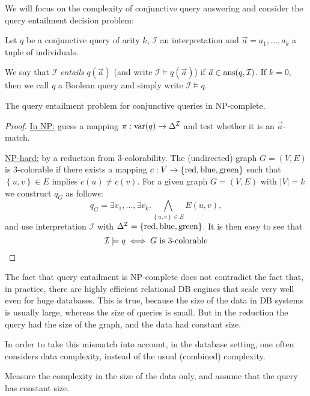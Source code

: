 \newpage
{}
We will focus on the complexity of conjunctive query answering and consider the query entailment decision problem:
\begin{definition}
	Let $q$ be a conjunctive query of arity $k$, $\mathcal{I}$ an interpretation
	and $\vec{a} = a_1, \ldots, a_k$ a tuple of individuals.

	We say that $\mathcal{I}$ \textit{entails} $q(\vec{a})$ (and write $\mathcal{I} \vDash q(\vec{a})$) if $\vec{a} \in \operatorname{\text{ans}}(q, \mathcal{I})$.
	If $k = 0$, then we call $q$ a Boolean query and simply write $\mathcal{I} \vDash q$.
\end{definition}

\begin{prop}
	The query entailment problem for conjunctive queries in \textsc{NP}-complete.
\end{prop}
\begin{proof}
	\underline{In \textsc{NP}:}
	guess a mapping $\pi: \operatorname{\text{var}}(q) \to \Delta^{\mathcal{I}}$ and test whether it is an $\vec{a}$-match.
	
	\underline{\textsc{NP}-hard:}
	by a reduction from 3-colorability.
	The (undirected) graph $G = (V,E)$ is 3-colorable if there exists a mapping
	$c: V \to \left\{ \mathit{\text{red}}, \mathit{\text{blue}}, \mathit{\text{green}} \right\}$ 
	such that $\left\{ u,v \right\} \in E$ implies $c(u) \neq c(v)$.
	For a given graph $G = (V, E)$ with $\lvert V \rvert = k$ we construct $q_G$ as follows:
	\[
		q_G = \exists v_1, \ldots, \exists v_k. \bigwedge_{\left\{ u,v \right\} \in E} E(u,v) 
	,\]
	and use interpretation $\mathcal{I}$ with $\Delta^{\mathcal{I}} = \left\{ \mathit{\text{red}}, \mathit{\text{blue}}, \mathit{\text{green}} \right\}$.
	It is then easy to see that
	\[
	\mathcal{I} \vDash q \iff G \text{ is 3-colorable} \qedhere
	\]
\end{proof}

The fact that query entailment is \textsc{NP}-complete does not contradict the fact that,
in practice, there are highly efficient relational DB engines that scale very well even for huge databases.
This is true, because the size of the data in DB systems is usually large, whereas the size of queries is small.
But in the reduction the query had the size of the graph, and the data had constant size.

In order to take this mismatch into account, in the database setting, one often considers data complexity,
instead of the usual (combined) complexity.
\begin{mdframed}[frametitle=Data complexity]
	Measure the complexity in the size of the data only,
	and assume that the query has constant size.
\end{mdframed}

